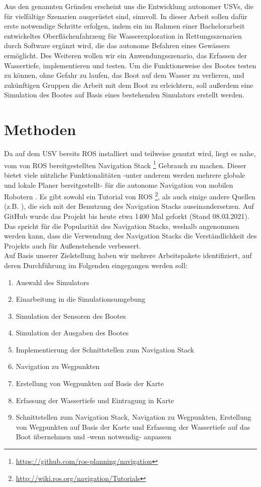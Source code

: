 \documentclass[conference]{IEEEtran}
\begin{document}
Aus den genannten Gründen erscheint uns die Entwicklung autonomer USVs, die für vielfältige Szenarien ausgerüstet sind, sinnvoll. In dieser Arbeit sollen dafür erste notwendige Schritte erfolgen, indem ein im Rahmen einer Bachelorarbeit entwickeltes Oberflächenfahrzeug für Wasserexploration in Rettungsszenarien durch Software ergänzt wird, die das autonome Befahren eines Gewässers ermöglicht. Des Weiteren wollen wir ein Anwendungsszenario, das Erfassen der Wassertiefe, implementieren und testen. Um die Funktionsweise des Bootes testen zu können, ohne Gefahr zu laufen, das Boot auf dem Wasser zu verlieren, und zukünftigen Gruppen die Arbeit mit dem Boot zu erleichtern, soll außerdem eine Simulation des Bootes auf Basis eines bestehenden Simulators erstellt werden.

\section{Methoden}
Da auf dem USV bereits ROS installiert und teilweise genutzt wird, liegt es nahe, vom von ROS bereitgestellten Navigation Stack \footnote{\url{https://github.com/ros-planning/navigation}} Gebrauch zu machen. Dieser bietet viele nützliche Funktionalitäten -unter anderem werden mehrere globale und lokale Planer bereitgestellt- für die autonome Navigation von mobilen Robotern \cite{b7}. Es gibt sowohl ein Tutorial von ROS \footnote{\url{http://wiki.ros.org/navigation/Tutorials}}, als auch einige andere Quellen (z.B. \cite{b7}), die sich mit der Benutzung des Navigation Stacks auseinandersetzen. Auf GitHub wurde das Projekt bis heute etwa 1400 Mal geforkt (Stand 08.03.2021). Das spricht für die Popularität des Navigation Stacks, weshalb angenommen werden kann, dass die Verwendung des Navigation Stacks die Verständlichkeit des Projekts auch für Außenstehende verbessert.\\
Auf Basis unserer Zielstellung haben wir mehrere Arbeitspakete identifiziert, auf deren Durchführung im Folgenden eingegangen werden soll:
\begin{enumerate}
	\item Auswahl des Simulators
	\item Einarbeitung in die Simulationsumgebung
	\item Simulation der Sensoren des Bootes
	\item Simulation der Ausgaben des Bootes
	\item Implementierung der Schnittstellen zum Navigation Stack
	\item Navigation zu Wegpunkten
	\item Erstellung von Wegpunkten auf Basis der Karte
	\item Erfassung der Wassertiefe und Eintragung in Karte
	\item Schnittstellen zum Navigation Stack, Navigation zu Wegpunkten, Erstellung von Wegpunkten auf Basis der Karte und Erfassung der Wassertiefe auf das Boot übernehmen und -wenn notwendig- anpassen
\end{enumerate}
\end{document}

